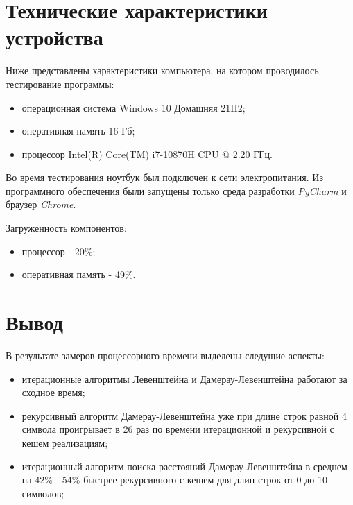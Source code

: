 \section{Технические характеристики устройства}

Ниже представлены характеристики компьютера, на котором проводилось тестирование программы:

\begin{itemize}
    \item операционная система Windows 10 Домашняя 21H2;
    \item оперативная память 16 Гб;
    \item процессор Intel(R) Core(TM) i7-10870H CPU @ 2.20 ГГц.
\end{itemize}

Во время тестирования ноутбук был подключен к сети электропитания. Из программного обеспечения были запущены только среда разработки \textit{PyCharm} и браузер \textit{Chrome}.

Загруженность компонентов:

\begin{itemize}
    \item процессор - 20\%;
    \item оперативная память - 49\%.
\end{itemize}


\section{Вывод}

В результате замеров процессорного времени выделены следущие аспекты:
\begin{itemize}
    \item итерационные алгоритмы Левенштейна и Дамерау-Левенштейна работают за сходное время;
    \item рекурсивный алгоритм Дамерау-Левенштейна уже при длине строк равной 4 символа проигрывает в 26 раз по времени итерационной и рекурсивной с кешем реализациям;
    \item итерационный алгоритм поиска расстояний Дамерау-Левенштейна в среднем на 42\% - 54\% быстрее рекурсивного с кешем для длин строк от 0 до 10 символов;
\end{itemize}

